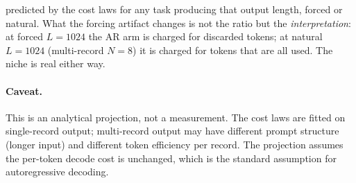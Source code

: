 predicted by the cost laws for any task producing that output length,
forced or natural. What the forcing artifact changes is not the ratio
but the \emph{interpretation}: at forced $L{=}1024$ the AR arm is charged
for discarded tokens; at natural $L{=}1024$ (multi-record $N{=}8$) it is
charged for tokens that are all used. The niche is real either way. \paragraph{Caveat.}
This is an analytical projection, not a measurement. The cost laws are
fitted on single-record output; multi-record output may have different
prompt structure (longer input) and different token efficiency per
record. The projection assumes the per-token decode cost is unchanged,
which is the standard assumption for autoregressive decoding.
